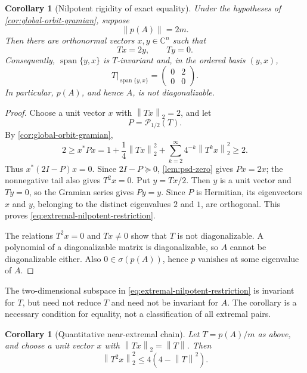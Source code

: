\documentclass[11pt,oneside,openany]{book}
\newtheorem{corollary}[theorem]{Corollary}
\theoremstyle{definition}
\theoremstyle{remark}
\newcommand{\C}{\mathbb C}
\newcommand{\spec}{\sigma}
\newcommand{\Span}{\operatorname{span}}
\newcommand{\norm}[1]{\left\lVert #1\right\rVert}
\begin{document}
\begin{corollary}[Nilpotent rigidity of exact equality]
\label{cor:nilpotent-rigidity}
Under the hypotheses of \cref{cor:global-orbit-gramian}, suppose
\[
  \norm{p(A)}=2m.
\]
Then there are orthonormal vectors \(x,y\in\C^n\) such that
\[
  Tx=2y,
  \qquad
  Ty=0.
\]
Consequently, \(\Span\{y,x\}\) is \(T\)-invariant and, in the ordered
basis \((y,x)\),
\begin{equation}
  T|_{\Span\{y,x\}}
  =
  \begin{pmatrix}0&2\\0&0\end{pmatrix}.
  \label{eq:extremal-nilpotent-restriction}
\end{equation}
In particular, \(p(A)\), and hence \(A\), is not diagonalizable.
\end{corollary}

\begin{proof}
Choose a unit vector \(x\) with \(\norm{Tx}_2=2\), and let
\[
  P=\mathcal P_{1/2}(T).
\]
By \cref{cor:global-orbit-gramian},
\[
  2
  \geq x^*Px
  =
  1+\frac14\norm{Tx}_2^2
  +\sum_{k=2}^{\infty}4^{-k}\norm{T^kx}_2^2
  \geq2.
\]
Thus \(x^*(2I-P)x=0\).  Since \(2I-P\succeq0\),
\cref{lem:psd-zero} gives \(Px=2x\); the nonnegative tail also gives
\(T^2x=0\).  Put \(y=Tx/2\).  Then \(y\) is a unit vector and \(Ty=0\),
so the Gramian series gives \(Py=y\).  Since \(P\) is Hermitian, its
eigenvectors \(x\) and \(y\), belonging to the distinct eigenvalues
\(2\) and \(1\), are orthogonal.  This proves
\eqref{eq:extremal-nilpotent-restriction}.

The relations \(T^2x=0\) and \(Tx\neq0\) show that \(T\) is not
diagonalizable.  A polynomial of a diagonalizable matrix is
diagonalizable, so \(A\) cannot be diagonalizable either.  Also
\(0\in\spec(p(A))\), hence \(p\) vanishes at some eigenvalue of \(A\).
\end{proof}

\begin{pitfall}
The two-dimensional subspace in
\eqref{eq:extremal-nilpotent-restriction} is invariant for \(T\), but
need not reduce \(T\) and need not be invariant for \(A\).  The
corollary is a necessary condition for equality, not a classification
of all extremal pairs.
\end{pitfall}

\begin{corollary}[Quantitative near-extremal chain]
\label{cor:near-extremal-chain}
Let \(T=p(A)/m\) as above, and choose a unit vector \(x\) with
\(\norm{Tx}_2=\norm{T}\).  Then
\begin{equation}
  \norm{T^2x}_2^2
  \leq
  4\left(4-\norm{T}^2\right).
  \label{eq:near-extremal-chain}
\end{equation}
\end{corollary}
\end{document}
